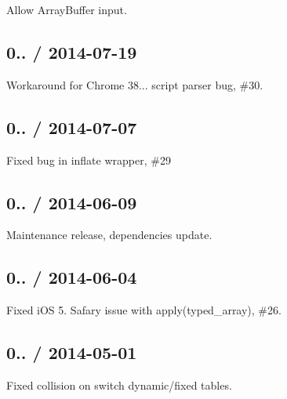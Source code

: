 \begin{DoxyItemize}
\item Allow Array\+Buffer input.
\end{DoxyItemize}

\subsection*{0.. / 2014-\/07-\/19 }


\begin{DoxyItemize}
\item Workaround for Chrome 38... script parser bug, \#30.
\end{DoxyItemize}

\subsection*{0.. / 2014-\/07-\/07 }


\begin{DoxyItemize}
\item Fixed bug in inflate wrapper, \#29
\end{DoxyItemize}

\subsection*{0.. / 2014-\/06-\/09 }


\begin{DoxyItemize}
\item Maintenance release, dependencies update.
\end{DoxyItemize}

\subsection*{0.. / 2014-\/06-\/04 }


\begin{DoxyItemize}
\item Fixed i\+OS 5. Safary issue with {\ttfamily apply(typed\+\_\+array)}, \#26.
\end{DoxyItemize}

\subsection*{0.. / 2014-\/05-\/01 }


\begin{DoxyItemize}
\item Fixed collision on switch dynamic/fixed tables.
\end{DoxyItemize}

